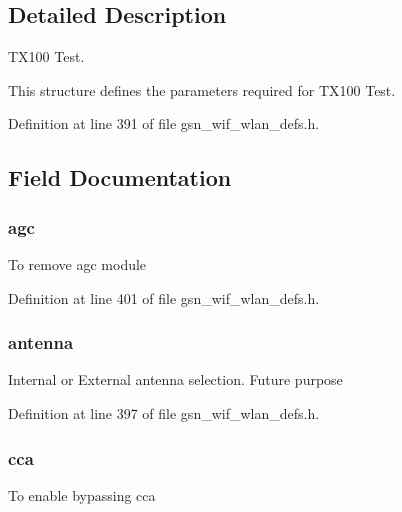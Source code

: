 \subsection{Detailed Description}
TX100 Test. 

This structure defines the parameters required for TX100 Test. 

Definition at line 391 of file gsn\_\-wif\_\-wlan\_\-defs.h.



\subsection{Field Documentation}
\hypertarget{a00189_a012088b16d12617334694210cd8ddfb8}{
\subsubsection[{agc}]{ {\bf agc}}}
\label{a00189_a012088b16d12617334694210cd8ddfb8}
To remove agc module 

Definition at line 401 of file gsn\_\-wif\_\-wlan\_\-defs.h.

\hypertarget{a00189_ad84150bc4d20a5e841d834b269db9901}{
\subsubsection[{antenna}]{ {\bf antenna}}}
\label{a00189_ad84150bc4d20a5e841d834b269db9901}
Internal or External antenna selection. Future purpose 

Definition at line 397 of file gsn\_\-wif\_\-wlan\_\-defs.h.

\hypertarget{a00189_a23fb83ac7301b94474f56a34bb365b83}{
\subsubsection[{cca}]{ {\bf cca}}}
\label{a00189_a23fb83ac7301b94474f56a34bb365b83}
To enable bypassing cca 

